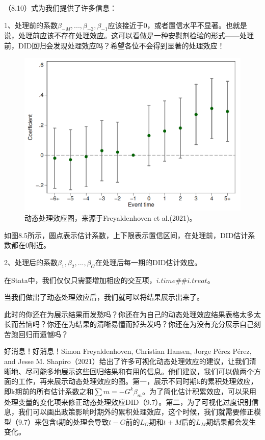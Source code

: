 \documentclass[cn,12pt,math=newtx,citestyle=gb7714-2015,bibstyle=gb7714-2015]{elegantbook}
\begin{document}
	（8.10）式为我们提供了许多信息：
	
	1、处理前的系数$\beta_{-M},...,\beta_{-2},\beta_{-1}$应该接近于0，或者置信水平不显著。也就是说，处理前应该不存在处理效应。这可以看做是一种安慰剂检验的形式——处理前，DID回归会发现处理效应吗？希望各位不会得到显著的处理效应！
	
	\begin{figure}[tbph]
		\centering
		\includegraphics[width=0.7\linewidth]{dynamicDID}
		\caption{动态处理效应图，来源于Freyaldenhoven et al.(2021)。}
		\label{fig:dynamicdid}
	\end{figure}
	
	如图8.5所示，圆点表示估计系数，上下限表示置信区间，在处理前，DID估计系数都在0附近。
	
	
	2、处理后的系数$\beta_{1},\beta_{2},...,\beta_{G}$在处理后每一期的DID估计效应。
	
	在Stata中，我们仅仅只需要增加相应的交互项，$i.time \#\# i.treat$。
	
	当我们做出了动态处理效应后，我们就可以将结果展示出来了。
	
	此时的你还在为展示结果而发愁吗？你还在为自己的动态处理效应结果表格太多太长而苦恼吗？你还在为结果的清晰易懂而掉头发吗？你还在为没有充分展示自己刻苦跑回归而遗憾吗？
	
	好消息！好消息！Simon Freyaldenhoven, Christian Hansen, Jorge Pérez Pérez, and Jesse M. Shapiro（2021）给出了许多可视化动态处理效应的建议，让我们清晰地、尽可能多地展示这些回归结果和有用的信息。他们建议，我们可以做两个方面的工作，再来展示动态处理效应的图。第一，展示不同时期k的累积处理效应，即k期前的所有估计系数之和$\sum{m=-G}^{k}\beta_m$。为了简化估计积累效应，可以采用处理变量的变化项来修正动态处理效应DID（9.7）。第二，为了可视化过度识别信息，我们可以画出政策影响时期外的累积处理效应，这个时候，我们就需要修正模型（9.7）来包含t期的处理会导致$t-G$前的$L_G$期和$t+M$后的$L_M$期结果都会发生变化。
	
\end{document}
